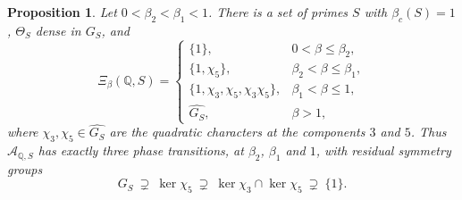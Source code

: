\documentclass[11pt]{amsart}
\numberwithin{equation}{section}
\newtheorem{proposition}[theorem]{Proposition}
\theoremstyle{definition}
\theoremstyle{remark}
\newcommand{\Q}{\mathbb{Q}}
\newcommand{\cA}{\mathcal{A}}
\begin{document}
\begin{proposition}\label{prop:cascade}
Let $0<\beta_2<\beta_1<1$. There is a set of primes $S$ with $\beta_c(S)=1$,
$\Theta_S$ dense in $G_S$, and
\[
\Xi_\beta(\Q,S)=\begin{cases}
\{1\},&0<\beta\le\beta_2,\\
\{1,\chi_5\},&\beta_2<\beta\le\beta_1,\\
\{1,\chi_3,\chi_5,\chi_3\chi_5\},&\beta_1<\beta\le1,\\
\widehat{G_S},&\beta>1,
\end{cases}
\]
where $\chi_3,\chi_5\in\widehat{G_S}$ are the quadratic characters at the
components $3$ and $5$. Thus $\cA_{\Q,S}$ has exactly three phase transitions,
at $\beta_2$, $\beta_1$ and $1$, with residual symmetry groups
\[
G_S\ \supsetneq\ \ker\chi_5\ \supsetneq\ \ker\chi_3\cap\ker\chi_5\ \supsetneq\ \{1\}.
\]
\end{proposition}
\end{document}
